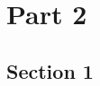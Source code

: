 \documentclass[module]{subfiles}
\begin{document}
\selectfont
\clearpage

\section{Part 2}
\begin{multicols}{2}

\subsection{Section 1}
\lipsum[1]

\end{multicols}
\end{document}
